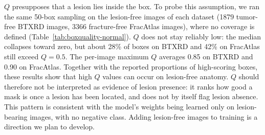 \begin{table}[t]
\caption{Candidate-region shortlist: $Q$-ranking vs a random-5 baseline and an oracle-5 upper bound, all drawn from the same 50 prompt-free boxes sampled per image. Coverage is the fraction of lesion pixels inside a box; near-complete-cov.\ counts images whose best-of-5 box reaches $\ge0.999$ coverage (random-5 uses the mean over 2,000 resamples per image).}
\label{tab:suggest}
\centering
\scriptsize
{}
\end{table}

$Q$ presupposes that a lesion lies inside the box. To probe this assumption, we ran the same 50-box sampling on the lesion-free images of each dataset (1879 tumor-free BTXRD images, 3366 fracture-free FracAtlas images), where no coverage is defined (Table~\ref{tab:boxquality-normal}). $Q$ does not stay reliably low: the median collapses toward zero, but about 28\% of boxes on BTXRD and 42\% on FracAtlas still exceed $Q = 0.5$. The per-image maximum $Q$ averages 0.85 on BTXRD and 0.90 on FracAtlas. Together with the reported proportions of high-scoring boxes, these results show that high $Q$ values can occur on lesion-free anatomy. $Q$ should therefore not be interpreted as evidence of lesion presence: it ranks how good a mask is once a lesion has been located, and does not by itself flag lesion absence. This pattern is consistent with the model's weights being learned only on lesion-bearing images, with no negative class. Adding lesion-free images to training is a direction we plan to develop.

\begin{table}[t]
\caption{Distribution of the self-assessment score $Q$ on lesion-free images, with 50 random boxes sampled per image. With no lesion present, coverage is undefined; only the distribution of $Q$ is reported.}
\label{tab:boxquality-normal}
\centering
\scriptsize
{}
\end{table}

